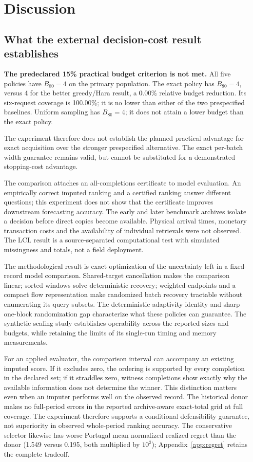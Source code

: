 \documentclass[12pt]{article}
\begin{document}
\section{Discussion}
\subsection{What the external decision-cost result establishes}
\textbf{The predeclared 15\% practical budget criterion is not met.} All five policies have $B_{80}=4$ on the primary population. The exact policy has $B_{80}=4$, versus 4 for the better greedy/Hara result, a 0.00\% relative budget reduction. Its six-request coverage is 100.00\%; it is no lower than either of the two prespecified baselines. Uniform sampling has $B_{80}=4$; it does not attain a lower budget than the exact policy.

The experiment therefore does not establish the planned practical advantage for exact acquisition over the stronger prespecified alternative. The exact per-batch width guarantee remains valid, but cannot be substituted for a demonstrated stopping-cost advantage.

The comparison attaches an all-completions certificate to model evaluation. An empirically correct imputed ranking and a certified ranking answer different questions; this experiment does not show that the certificate improves downstream forecasting accuracy. The early and later benchmark archives isolate a decision before direct copies become available. Physical arrival times, monetary transaction costs and the availability of individual retrievals were not observed. The LCL result is a source-separated computational test with simulated missingness and totals, not a field deployment.

The methodological result is exact optimization of the uncertainty left in
a fixed-record model comparison. Shared-target cancellation makes the
comparison linear; sorted windows solve deterministic recovery; weighted
endpoints and a compact flow representation make randomized batch recovery
tractable without enumerating its query subsets. The deterministic adaptivity
identity and sharp one-block randomization gap characterize what these
policies can guarantee. The synthetic scaling study establishes operability
across the reported sizes and budgets, while retaining the limits of its
single-run timing and memory measurements.

For an applied evaluator, the comparison interval can accompany an existing
imputed score. If it excludes zero, the ordering is supported by every
completion in the declared set; if it straddles zero, witness completions
show exactly why the available information does not determine the winner.
This distinction matters even when an imputer performs well on the observed
record. The historical donor makes no full-period errors in the reported
archive-aware exact-total grid at full coverage. The experiment therefore
supports a conditional defensibility guarantee, not superiority in observed
whole-period ranking accuracy. The conservative selector likewise has worse
Portugal mean normalized realized regret than the donor (1.549 versus 0.195,
both multiplied by $10^3$); Appendix~\ref{app:regret} retains the complete
tradeoff.
\end{document}
